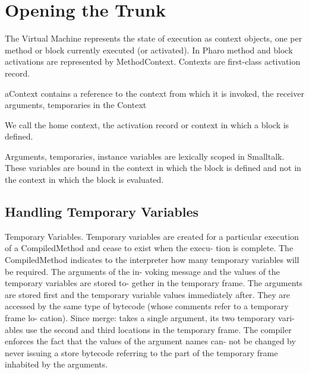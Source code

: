 \documentclass[a4paper,10pt,twoside]{book}
\begin{document}



\section{Opening the Trunk}

The Virtual Machine represents the state of execution as context objects, one per method or block currently executed (or activated). In Pharo method and block activations are represented by MethodContext.
Contexts are first-class activation record.

aContext contains a reference to the context from which it is invoked, the receiver arguments, temporaries in the Context

We call the home context, the activation record or context in which a block is defined.

Arguments, temporaries, instance variables are lexically scoped in Smalltalk. These variables are bound in the context in which the block is defined and not in the context in which the block is evaluated.

\subsection{Handling Temporary Variables}
Temporary Variables.
 Temporary variables are created for a particular execution of a CompiledMethod and cease to exist when the execu- tion is complete. The CompiledMethod indicates to the interpreter how many temporary variables will be required. The arguments of the in- voking message and the values of the temporary variables are stored to- gether in the temporary frame. The arguments are stored first and the temporary variable values immediately after. They are accessed by the same type of bytecode (whose comments refer to a temporary frame lo- cation). Since merge: takes a single argument, its two temporary vari- ables use the second and third locations in the temporary frame. The compiler enforces the fact that the values of the argument names can- not be changed by never issuing a store bytecode referring to the part of the temporary frame inhabited by the arguments.
\end{document}
